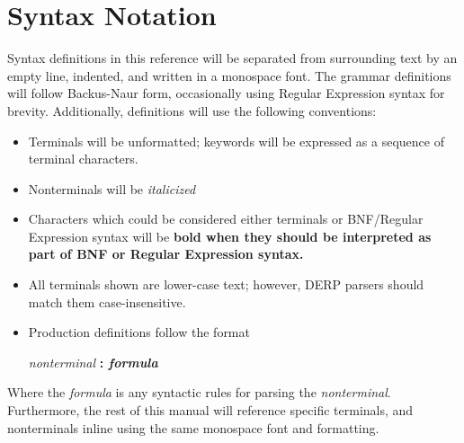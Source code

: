\section{Syntax Notation}
Syntax definitions in this reference will be separated from surrounding text by an empty line, 
indented, and written in a monospace font. The grammar definitions will follow Backus-Naur form, 
occasionally using Regular Expression syntax for brevity. Additionally, definitions will use the following conventions:
\begin{itemize}
\item Terminals will be unformatted; keywords will be expressed as a sequence of terminal characters.
\item Nonterminals will be \emph{italicized}
\item Characters which could be considered either terminals or BNF/Regular Expression syntax will be \bf{bold} when they should be interpreted as part of BNF or Regular Expression syntax.
\item All terminals shown are lower-case text; however, DERP parsers should match them case-insensitive.
\item Production definitions follow the format
\begin{center}
\emph{nonterminal} \bf{:} \emph{formula}
\end{center}
\end{itemize}

Where the \emph{formula} is any syntactic rules for parsing the \emph{nonterminal}.
Furthermore,  the rest of this manual will reference specific terminals, and nonterminals inline using the same monospace font and formatting.
